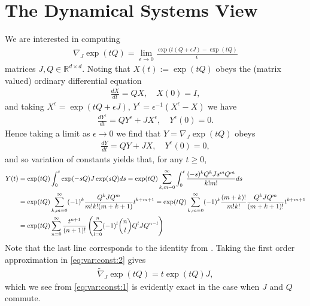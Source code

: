 \documentclass[twoside]{article}
\numberwithin{equation}{section}
\newcommand{\RR}{\mathbb{R}}
\begin{document}
\section{The Dynamical Systems View}
We are interested in computing 
\begin{align}
\label{eq:grad:def}
	\nabla_J \exp(t Q) = \lim_{\epsilon \to 0} \frac{\exp(t (Q+ \epsilon J) - \exp(tQ) }{\epsilon}
\end{align}
matrices  $J, Q \in \RR^{d\times d}$.
Noting that $X(t) := \exp(t Q)$ obeys the (matrix valued) ordinary differential equation
\begin{align}
	\label{eq:exptQ}
	\frac{dX}{dt} = Q X, \quad X(0) = I,
\end{align}
and taking $X^\epsilon =  \exp(t Q+ \epsilon J)$, $Y^\epsilon = \epsilon^{-1} ( X^\epsilon- X)$
we have 
\begin{align*}
	\frac{dY^\epsilon}{dt}  = Q Y^\epsilon + J X^\epsilon, \quad Y^\epsilon(0) = 0.
\end{align*}
Hence taking a limit as $\epsilon \to 0$ we find that $Y = \nabla_J \exp(t Q)$ obeys
\begin{align}
	\frac{dY}{dt}  = Q Y + J X, \quad Y^\epsilon(0) = 0,
	\label{eq:sen:eq}
\end{align}
and so variation of constants yields that, for any $t \geq 0$, 
\begin{align}
	Y(t) &= \exp(t Q) \int_0^t \exp(-sQ) J \exp(sQ) ds
	= \exp(t Q) \sum_{k,m = 0}^\infty \int_0^t \frac{(-s)^{k} Q^k J s^{m}Q^m}{k!m!}ds
		\label{eq:var:const:1}\\
	&=  \exp(t Q) \sum_{k,m = 0}^\infty (-1)^k \frac{Q^k J Q^m}{m! k!(m+k+1)} t^{k+m+1}
	=  \exp(t Q) \sum_{k,m = 0}^\infty (-1)^k \frac{(m+k)!}{m! k!} \frac{Q^k J Q^m}{(m+k+1)!} t^{k+m+1}
	\notag\\
	&=  \exp(t Q) \sum_{n = 0}^\infty \frac{t^{n+1}}{(n+1)!}  
	\left( \sum_{l = 0}^n (-1)^l \binom{n}{l} Q^l J Q^{n -l}\right)
	\label{eq:var:const:2}
\end{align}
Note that the last line corresponds to the identity from \cite{najfeld1995derivatives}.  Taking the  first order
approximation in \eqref{eq:var:const:2} gives
\begin{align}
	\tilde{\nabla}_J \exp(t Q) = t  \exp(t Q) J,
\end{align}
which we see from \eqref{eq:var:const:1} is evidently exact in the case when $J$ and $Q$ commute. 
\end{document}
